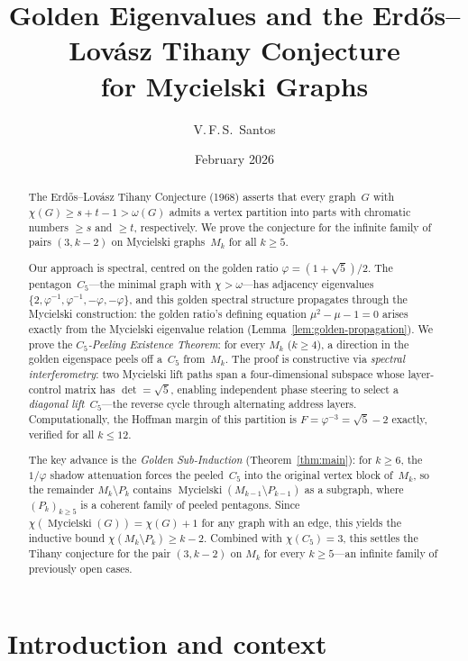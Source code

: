 \documentclass[11pt,a4paper]{amsart}
\title[Golden Eigenvalues and the Tihany Conjecture for Mycielski Graphs]{%
  Golden Eigenvalues and the Erd\H{o}s--Lov\'asz Tihany Conjecture\\
  for Mycielski Graphs}
\author{V.\,F.\,S.\ Santos}
\date{February 2026}
\theoremstyle{plain}
\theoremstyle{definition}
\theoremstyle{remark}
\newcommand{\vp}{\varphi}
\newcommand{\myc}{\operatorname{Mycielski}}
\newcommand{\chr}{\chi}
\newcommand{\om}{\omega}
\begin{document}
\begin{abstract}
The Erd\H{o}s--Lov\'asz Tihany Conjecture (1968) asserts that every graph~$G$
with $\chr(G) \geq s+t-1 > \om(G)$ admits a vertex partition into parts with
chromatic numbers $\geq s$ and $\geq t$, respectively.  We prove the conjecture
for the infinite family of pairs $(3, k{-}2)$ on Mycielski graphs~$M_k$ for all
$k \geq 5$.

Our approach is spectral, centred on the golden ratio
$\vp = (1+\sqrt{5})/2$.  The pentagon~$C_5$---the minimal graph with
$\chr > \om$---has adjacency eigenvalues
$\{2, \vp^{-1}, \vp^{-1}, -\vp, -\vp\}$, and this golden spectral structure
propagates through the Mycielski construction: the golden ratio's defining
equation $\mu^2 - \mu - 1 = 0$ arises exactly from the Mycielski eigenvalue
relation (Lemma~\ref{lem:golden-propagation}).  We prove the \emph{$C_5$-Peeling
Existence Theorem}: for every $M_k$ ($k\geq 4$), a direction in the golden
eigenspace peels off a~$C_5$ from~$M_k$.  The proof is constructive via
\emph{spectral interferometry}: two Mycielski lift paths span a four-dimensional
subspace whose layer-control matrix has $\det = \sqrt{5}$, enabling independent
phase steering to select a \emph{diagonal lift}~$C_5$---the reverse cycle
through alternating address layers.  Computationally, the Hoffman margin of this
partition is $F = \vp^{-3} = \sqrt{5}-2$ exactly, verified for all $k \leq 12$.

The key advance is the \emph{Golden Sub-Induction}
(Theorem~\ref{thm:main}): for $k \geq 6$, the $1/\vp$ shadow attenuation forces the
peeled~$C_5$ into the original vertex block of~$M_k$, so the remainder
$M_k \setminus P_k$ contains $\myc(M_{k-1}\setminus P_{k-1})$ as a subgraph,
where $(P_k)_{k\geq 5}$ is a coherent family of peeled pentagons.
Since $\chr(\myc(G)) = \chr(G)+1$ for any graph with an edge, this yields the
inductive bound $\chr(M_k \setminus P_k) \geq k-2$.  Combined with
$\chr(C_5) = 3$, this settles the Tihany conjecture for the pair $(3,k{-}2)$ on
$M_k$ for every $k\geq 5$---an infinite family of previously open cases.
\end{abstract}

\maketitle

\section{Introduction and context}\label{sec:intro}
\end{document}

